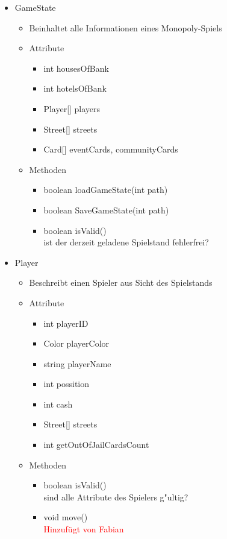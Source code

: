 \documentclass[a4paper,10pt]{article}
\begin{document}
\begin{itemize}

\item GameState
\begin{itemize}
\item Beinhaltet alle Informationen eines Monopoly-Spiels
\item Attribute
\begin{itemize}
\item int housesOfBank
\item int hotelsOfBank
\item Player[] players
\item Street[] streets
\item Card[] eventCards, communityCards
\end{itemize}
\item Methoden
\begin{itemize}
\item boolean loadGameState(int path)
\item boolean SaveGameState(int path)
\item boolean isValid()
\\ist der derzeit geladene Spielstand fehlerfrei?
\end{itemize}
\end{itemize}

\item Player
\begin{itemize}
\item Beschreibt einen Spieler aus Sicht des Spielstands
\item Attribute
\begin{itemize}
\item int playerID
\item Color playerColor
\item string playerName
\item int possition
\item int cash
\item Street[] streets
\item int getOutOfJailCardsCount
\end{itemize}
\item Methoden
\begin{itemize}
\item boolean isValid()
\\sind alle Attribute des Spielers g"ultig?
\item void move()
\\ \textcolor{red}{Hinzufügt von Fabian}
\end{itemize}
\end{itemize}


\end{itemize}
\end{document}
